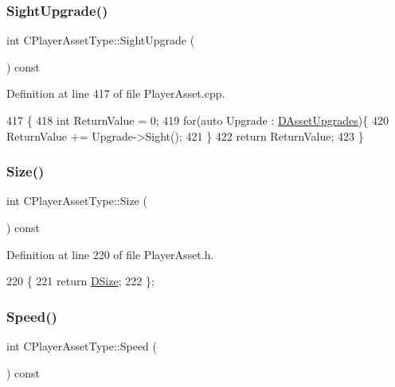 \subsubsection{\texorpdfstring{Sight\+Upgrade()}{SightUpgrade()}}
{\footnotesize\ttfamily int C\+Player\+Asset\+Type\+::\+Sight\+Upgrade (\begin{DoxyParamCaption}{ }\end{DoxyParamCaption}) const}



Definition at line 417 of file Player\+Asset.\+cpp.


\begin{DoxyCode}
417                                         \{
418     \textcolor{keywordtype}{int} ReturnValue = 0;
419     \textcolor{keywordflow}{for}(\textcolor{keyword}{auto} Upgrade : \hyperlink{classCPlayerAssetType_aeb8d5c3ea81ea56248d02a5e24d48001}{DAssetUpgrades})\{
420         ReturnValue += Upgrade->Sight();
421     \}
422     \textcolor{keywordflow}{return} ReturnValue;
423 \}
\end{DoxyCode}
\hypertarget{classCPlayerAssetType_afbddb44e9ff99768f18034bcc1daaeaa}{}\label{classCPlayerAssetType_afbddb44e9ff99768f18034bcc1daaeaa} 
\subsubsection{\texorpdfstring{Size()}{Size()}}
{\footnotesize\ttfamily int C\+Player\+Asset\+Type\+::\+Size (\begin{DoxyParamCaption}{ }\end{DoxyParamCaption}) const\hspace{0.3cm}{\ttfamily [inline]}}



Definition at line 220 of file Player\+Asset.\+h.


\begin{DoxyCode}
220                         \{
221             \textcolor{keywordflow}{return} \hyperlink{classCPlayerAssetType_a00e59fe19f83fe37f23341c05010dbc2}{DSize};  
222         \};
\end{DoxyCode}
\hypertarget{classCPlayerAssetType_a6d9ea6aa96593e3e08401972b82a705d}{}\label{classCPlayerAssetType_a6d9ea6aa96593e3e08401972b82a705d} 
\subsubsection{\texorpdfstring{Speed()}{Speed()}}
{\footnotesize\ttfamily int C\+Player\+Asset\+Type\+::\+Speed (\begin{DoxyParamCaption}{ }\end{DoxyParamCaption}) const\hspace{0.3cm}{\ttfamily [inline]}}



